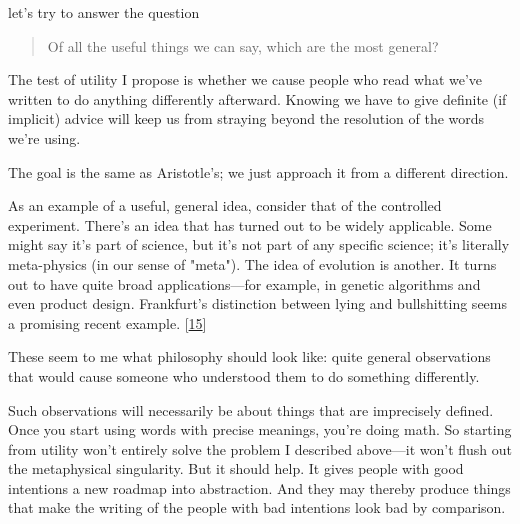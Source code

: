                   let's try to answer the question
                  \begin{quote}

                    Of all the useful things we can say, which are the most
                    general?
                  
\end{quote}

                  The test of utility I propose is whether we cause people who
                  read what we've written to do anything differently afterward.
                  Knowing we have to give definite (if implicit) advice will
                  keep us from straying beyond the resolution of the words we're
                  using.

The goal is the same as Aristotle's; we just
                  approach it from a different direction.

As an
                  example of a useful, general idea, consider that of the
                  controlled experiment. There's an idea that has turned out to
                  be widely applicable. Some might say it's part of science, but
                  it's not part of any specific science; it's literally
                  meta-physics (in our sense of "meta"). The idea of evolution
                  is another. It turns out to have quite broad
                  applications---for example, in genetic algorithms and even
                  product design. Frankfurt's distinction between lying and
                  bullshitting seems a promising recent example.
                  [\href{\#f15n}{15}]

These seem to me what philosophy should look
                  like: quite general observations that would cause someone who
                  understood them to do something differently.

Such
                  observations will necessarily be about things that are
                  imprecisely defined. Once you start using words with precise
                  meanings, you're doing math. So starting from utility won't
                  entirely solve the problem I described above---it won't
                  flush out the metaphysical singularity. But it should help. It
                  gives people with good intentions a new roadmap into
                  abstraction. And they may thereby produce things that make the
                  writing of the people with bad intentions look bad by
                  comparison.

